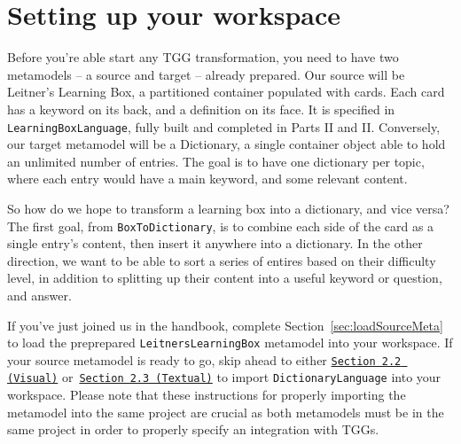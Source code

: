 \newpage
\section{Setting up your workspace}
\genHeader

Before you're able start any TGG transformation, you need to have two metamodels -- a source and target -- already prepared. Our source will be Leitner's
Learning Box, a partitioned container populated with cards. Each card has a keyword on its back, and a definition on its face. It is specified in
\texttt{LearningBoxLanguage}, fully built and completed in Parts II and II. Conversely, our target metamodel will be a Dictionary, a single container object
able to hold an unlimited number of entries. The goal is to have one dictionary per topic, where each entry would have a main keyword, and some relevant content. 

So how do we hope to transform a learning box into a dictionary, and vice versa? The first goal, from \texttt{BoxToDictionary}, is to combine each side of the
card as a single entry's content, then insert it anywhere into a dictionary. In the other direction, we want to be able to sort a series of entires based on
their difficulty level, in addition to splitting up their content into a useful keyword or question, and answer.

If you've just joined us in the handbook, complete Section~\ref{sec:loadSourceMeta} to load the preprepared \texttt{LeitnersLearningBox} metamodel into your
workspace. If your source metamodel is ready to go, skip ahead to  either \texttt{\hyperlink{sec:multiEAP}{Section 2.2 (Visual)}}
or~\texttt{\hyperlink{sec:multiMOSL}{Section 2.3 (Textual)}} to import \texttt{DictionaryLanguage} into your workspace. Please note that these instructions for
properly importing the metamodel into the same project are crucial as both metamodels must be in the same project in order to properly specify an integration
with TGGs.

